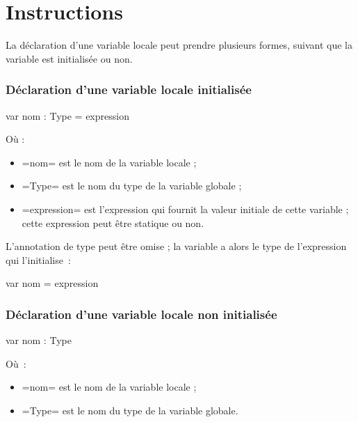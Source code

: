 




\chapter{Instructions}






La déclaration d'une variable locale peut prendre plusieurs formes, suivant que la variable est initialisée ou non.

\subsection{Déclaration d'une variable locale initialisée}

\begin{OMNIBUS}
var nom : Type = expression
\end{OMNIBUS}

Où :
\begin{itemize}
  \item \omnibus=nom= est le nom de la variable locale ;
  \item \omnibus=Type= est le nom du type de la variable globale ;
  \item \omnibus=expression= est l'expression qui fournit la valeur initiale de cette variable ; cette expression peut être statique ou non.
\end{itemize}

L'annotation de type peut être omise ; la variable a alors le type de l'expression qui l'initialise~:
\begin{OMNIBUS}
var nom = expression
\end{OMNIBUS}


\subsection{Déclaration d'une variable locale non initialisée}
\begin{OMNIBUS}
var nom : Type
\end{OMNIBUS}
Où~:
\begin{itemize}
  \item \omnibus=nom= est le nom de la variable locale ;
  \item \omnibus=Type= est le nom du type de la variable globale.
\end{itemize}

